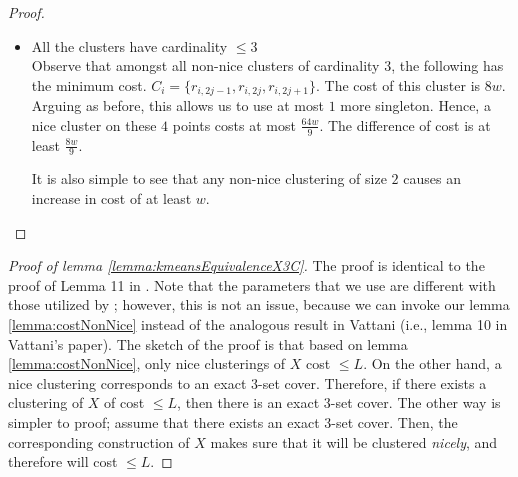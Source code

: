 \documentclass[letterpaper,12pt,titlepage,oneside,final]{book}
\newtheorem{lemma}{Lemma}
\begin{document}
\begin{proof}
\begin{itemize}[nolistsep,leftmargin=*]
\item All the clusters have cardinality $\le 3$ \\
Observe that amongst all non-nice clusters of cardinality $3$, the following has the minimum cost. $C_i = \{r_{i, 2j-1}, r_{i, 2j}, r_{i, 2j+1}\}$. The cost of this cluster is $8w$. Arguing as before, this allows us to use at most $1$ more singleton. Hence, a nice cluster on these $4$ points costs at most $\frac{64w}{9}$. The difference of cost is at least $\frac{8w}{9}$.

It is also simple to see that any non-nice clustering of size $2$ causes an increase in cost of at least $w$.

\end{itemize}
\end{proof}

\begin{proof}[Proof of lemma \ref{lemma:kmeansEquivalenceX3C}]
The proof is identical to the proof of Lemma 11 in \cite{vattani2009hardness}. Note that the parameters that we use are different with those utilized by \cite{vattani2009hardness}; however, this is not an issue, because we can invoke our lemma \ref{lemma:costNonNice} instead of the analogous result in Vattani (i.e., lemma 10 in Vattani's paper). The sketch of the proof is that based on lemma \ref{lemma:costNonNice}, only nice clusterings of $X$ cost $\le L$. On the other hand, a nice clustering corresponds to an exact 3-set cover. Therefore, if there exists a clustering of $X$ of cost $\le L$, then there is an exact 3-set cover. The other way is simpler to proof; assume that there exists an exact 3-set cover. Then, the corresponding construction of $X$ makes sure that it will be clustered \emph{nicely}, and therefore will cost $\le L$.  



\end{proof}
\end{document}
